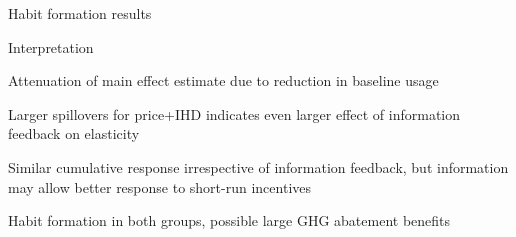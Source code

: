 \documentclass[aspectratio=169]{beamer}
\newenvironment{wideitemize}{\itemize\addtolength{\itemsep}{10pt}}{\enditemize}
\begin{document}
\begin{frame}{Habit formation results}
    \center
\end{frame}

\begin{frame}{Interpretation}
    \begin{wideitemize}
        \item Attenuation of main effect estimate due to reduction in baseline usage
        \item Larger spillovers for price+IHD indicates even larger effect of information feedback on elasticity
        \item Similar cumulative response irrespective of information feedback, but information may allow better response to short-run incentives
        \item Habit formation in both groups, possible large GHG abatement benefits
    \end{wideitemize}
\end{frame}
\end{document}

